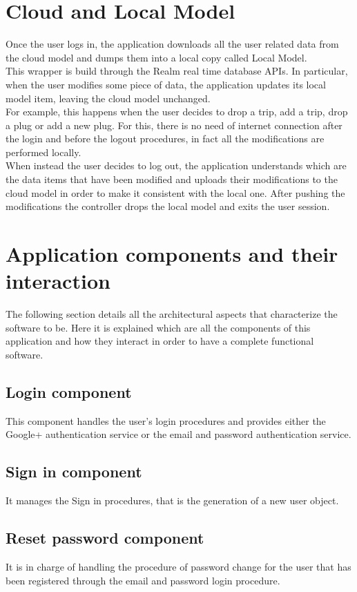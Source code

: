 \section{Cloud and Local Model}
Once the user logs in, the application downloads all the user related data from the cloud model and dumps them into a local copy called Local Model. \\
This wrapper is build through the Realm real time database APIs. In particular, when the user modifies some piece of data, the application updates its local model item, leaving the cloud model unchanged.\\
For example, this happens when the user decides to drop a trip, add a trip, drop a plug or add a new plug. 
For this, there is no need of internet connection after the login and before the logout procedures, in fact all the modifications are performed locally.\\
When instead the user decides to log out, the application understands which are the data items that have been modified and uploads their modifications to the cloud model in order to make it consistent with the local one. 
After pushing the modifications the controller drops the local model and exits the user session.

\section{Application components and their interaction}
The following section details all the architectural aspects that characterize the software to be. Here it is explained which are all the components of this application and how they interact in order to have a complete functional software.

\subsection{Login component}
This component handles the user's login procedures and provides either the Google+ authentication service or the email and password authentication service.

\subsection{Sign in component}
It manages the Sign in procedures, that is the generation of a new user object.

\subsection{Reset password component}
It is in charge of handling the procedure of password change for the user that has been registered through the email and password login procedure.


